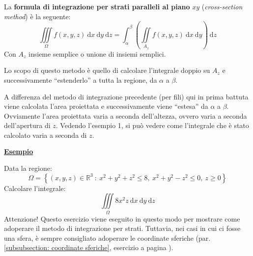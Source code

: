 \documentclass[a4paper]{article}
\newcommand{\dquotes}[1]{``#1''}
\newcommand{\definition}[1]{\textcolor{Red3}{\textbf{#1}}}
\newcommand{\example}[1]{\textcolor{Green4}{\textbf{#1}}}
\begin{document}
	\begin{boxdef}
		La \definition{formula di integrazione per strati paralleli al piano} $xy$ (\emph{cross-section method}) è la seguente:
		\begin{equation}\label{eq: formula di integrazione per strati}
			\displaystyle\iiint\limits_{\Omega} f\left(x,y,z\right) \:\mathrm{d}x\:\mathrm{d}y\:\mathrm{d}z = \displaystyle\int_{\alpha}^{\beta}\left(\iint\limits_{A_{z}} f\left(x,y,z\right) \:\mathrm{d}x\:\mathrm{d}y\right) \:\mathrm{d}z
		\end{equation}
		Con $A_{z}$ insieme semplice o unione di insiemi semplici.
	\end{boxdef}

	\noindent
	Lo scopo di questo metodo è quello di calcolare l'integrale doppio su $A_{z}$ e successivamente \dquotes{estenderlo} a tutta la regione, da $\alpha$ a $\beta$.
	
	A differenza del metodo di integrazione precedente (per fili) qui in prima battuta viene calcolata l'area proiettata e successivamente viene \dquotes{estesa} da $\alpha$ a $\beta$. Ovviamente l'area proiettata varia a seconda dell'altezza, ovvero varia a seconda dell'apertura di $z$. Vedendo l'esempio 1, si può vedere come l'integrale che è stato calcolato varia a seconda di $z$.\newpage

	\begin{flushleft}
		\example{\underline{Esempio}}
	\end{flushleft}
	Data la regione:
	\begin{equation*}
		\Omega = \left\{\left(x,y,z\right) \in \mathbb{R}^{3} \: : \: x^{2} + y^{2} + z^{2} \le 8, \: x^{2} + y^{2} - z^{2} \le 0, \: z \ge 0\right\}
	\end{equation*}
	Calcolare l'integrale:
	\begin{equation*}
		\displaystyle\iiint\limits_{\Omega} 8x^{2}z \:\mathrm{d}x\:\mathrm{d}y\:\mathrm{d}z
	\end{equation*}
	Attenzione! Questo esercizio viene eseguito in questo modo per mostrare come adoperare il metodo di integrazione per strati. Tuttavia, nei casi in cui ci fosse una sfera, è sempre consigliato adoperare le coordinate sferiche (par. \ref{subsubsection: coordinate sferiche}, esercizio a pagina \pageref{esempio coordinate sferiche}).
\end{document}
